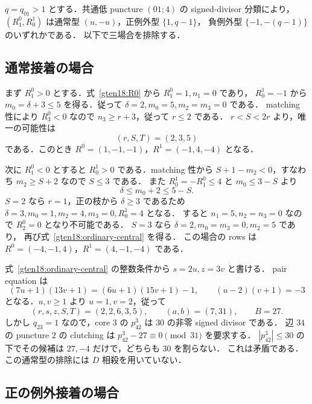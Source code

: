$q=q_{01}>1$ とする．共通低 puncture $(01;4)$ の signed-divisor 分類により，
$(R^0_1,R^1_0)$ は通常型 $(u,-u)$，正例外型 $\{1,q-1\}$，
負例外型 $\{-1,-(q-1)\}$ のいずれかである．
以下で三場合を排除する．

\subsection{通常接着の場合}

まず $R^0_1>0$ とする．式~\eqref{gten18:R0} から $R^0_1=1,n_1=0$ であり，
$R^1_0=-1$ から $m_0=\delta+3\le5$ を得る．従って
$\delta=2,m_0=5,m_2=m_3=0$ である．
matching 性により $R^0_3<0$ なので $n_3\ge r+3$，従って $r\le2$ である．
$r<S<2r$ より，唯一の可能性は
\begin{equation}\label{gten18:ordinary-central}
 (r,S,T)=(2,3,5)
\end{equation}
である．このとき $R^0=(1,-1,-1)$，$R^1=(-1,4,-4)$ となる．

次に $R^0_1<0$ とすると $R^1_0>0$ である．matching 性から
$S+1-m_2<0$，すなわち $m_2\ge S+2$ なので $S\le3$ である．
また $R^1_0=-R^0_1\le4$ と $m_0\le3-S$ より
\[
 \delta\le m_0+2\le5-S.
\]
$S=2$ なら $r=1$，正の枝から $\delta\ge3$ であるため
$\delta=3,m_0=1,m_2=4,m_3=0,R^1_0=4$ となる．
すると $n_1=5,n_2=n_3=0$ なので $R^0_2=0$ となり不可能である．
$S=3$ なら $\delta=2,m_0=m_3=0,m_2=5$ であり，
再び式~\eqref{gten18:ordinary-central} を得る．
この場合の rows は $R^0=(-4,-1,4)$，$R^1=(4,-1,-4)$ である．

式~\eqref{gten18:ordinary-central} の整数条件から $s=2u,z=3v$ と書ける．
pair equation は
\[
 (7u+1)(13v+1)=(6u+1)(15v+1)-1,
 \qquad (u-2)(v+1)=-3
\]
となる．$u,v\ge1$ より $u=1,v=2$，従って
\[
 (r,s,z,S,T)=(2,2,6,3,5),\qquad (a,b)=(7,31),\qquad B=27.
\]
しかし $q_{23}=1$ なので，core $3$ の $p^3_{42}$ は $30$ の非零 signed divisor である．
辺 $34$ の puncture $2$ の clutching は
$p^3_{42}-27\equiv0\pmod{31}$ を要求する．
$|p^3_{42}|\le30$ の下でその候補は $27,-4$ だけで，どちらも $30$ を割らない．
これは矛盾である．この通常型の排除には $D$ 相殺を用いていない．

\subsection{正の例外接着の場合}

